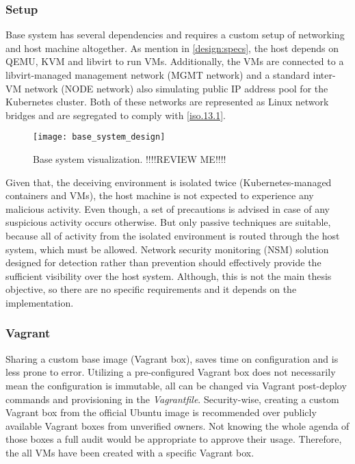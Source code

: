 
\subsubsection*{Setup \label{design:env-arch:base:setup}}
Base system has several dependencies and requires a custom setup of networking and host machine altogether. As mention in \autoref{design:specs}, the host depends on QEMU, KVM and libvirt to run VMs. Additionally, the VMs are connected to a libvirt-managed management network (MGMT network) and a standard inter-VM network (NODE network) also simulating public IP address pool for the Kubernetes cluster. Both of these networks are represented as Linux network bridges and are segregated to comply with \ref{iso.13.1}.

\begin{figure}[h]
	\centering
	\texttt{[image: base\_system\_design]}
	\caption{Base system visualization. !!!!REVIEW ME!!!!}
	\label{image:design:base_system}
\end{figure}

Given that, the deceiving environment is isolated twice (Kubernetes-managed containers and VMs), the host machine is not expected to experience any malicious activity. Even though, a set of precautions is advised in case of any suspicious activity occurs otherwise. But only passive techniques are suitable, because all of activity from the isolated environment is routed through the host system, which must be allowed. Network security monitoring (NSM) solution designed for detection rather than prevention should effectively provide the sufficient visibility over the host system. Although, this is not the main thesis objective, so there are no specific requirements and it depends on the implementation.

\subsubsection*{Vagrant \label{design:env-arch:base:vagrant}}
Sharing a custom base image (Vagrant box), saves time on configuration and is less prone to error. Utilizing a pre-configured Vagrant box does not necessarily mean the configuration is immutable, all can be changed via Vagrant post-deploy commands and provisioning in the \textit{Vagrantfile}. Security-wise, creating a custom Vagrant box from the official Ubuntu image is recommended over publicly available Vagrant boxes from unverified owners. Not knowing the whole agenda of those boxes a full audit would be appropriate to approve their usage. Therefore, the all VMs have been created with a specific Vagrant box.

